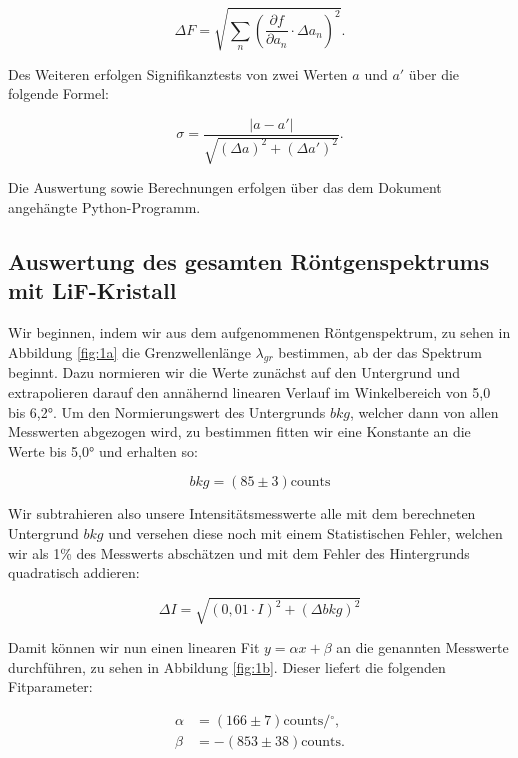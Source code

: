 \documentclass{article}
\begin{document}
\begin{equation}
    \Delta F = \sqrt{\sum_n \left( \frac{\partial f}{\partial a_n} \cdot \Delta a_n \right)^2}.
\end{equation}

Des Weiteren erfolgen Signifikanztests von zwei Werten $a$ und $a'$ über die folgende Formel:

\begin{equation}
    \sigma = \frac{|a-a'|}{\sqrt{(\Delta a)^2 + (\Delta a')^2}}.
\end{equation}

Die Auswertung sowie Berechnungen erfolgen über das dem Dokument angehängte Python-Programm.

\newpage

\subsection{Auswertung des gesamten Röntgenspektrums mit LiF-Kristall}

Wir beginnen, indem wir aus dem aufgenommenen Röntgenspektrum, zu sehen in Abbildung \ref{fig:1a} die Grenzwellenlänge $\lambda_{gr}$ bestimmen, ab der das Spektrum beginnt. Dazu normieren wir die Werte zunächst auf den Untergrund und extrapolieren darauf den annähernd linearen Verlauf im Winkelbereich von 5,0 bis 6,2°. Um den Normierungswert des Untergrunds $bkg$, welcher dann von allen Messwerten abgezogen wird, zu bestimmen fitten wir eine Konstante an die Werte bis 5,0° und erhalten so:

\begin{equation}
    bkg = (85 \pm 3) \text{counts}
\end{equation}

Wir subtrahieren also unsere Intensitätsmesswerte alle mit dem berechneten Untergrund $bkg$ und versehen diese noch mit einem Statistischen Fehler, welchen wir als 1\% des Messwerts abschätzen und mit dem Fehler des Hintergrunds quadratisch addieren:

\begin{equation}
    \Delta I = \sqrt{(0,01 \cdot I)^2 + (\Delta bkg)^2}
\end{equation}

Damit können wir nun einen linearen Fit $y = \alpha x + \beta$ an die genannten Messwerte durchführen, zu sehen in Abbildung \ref{fig:1b}. Dieser liefert die folgenden Fitparameter:

\begin{equation}
    \begin{split}
        \alpha &= (166 \pm 7) \text{counts}/{^\circ}, \\
        \beta &= -(853 \pm 38) \text{counts}. 
    \end{split}
\end{equation}
\end{document}
